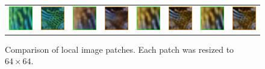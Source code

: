 \documentclass[letterpaper, 10pt, conference]{ieeeconf}
\begin{document}
\begin{figure}
\begin{tabular}{p{1.8cm} p{1.85cm} p{1.8cm} p{1.8cm} p{1.8cm} p{1.8cm} p{1.8cm} p{1.9cm} }
   \includegraphics[width=0.8in]{flickr_crop3} &
   \includegraphics[width=0.8in]{flickr_crop4} &
   \includegraphics[width=0.8in]{cgan_crop3} &
   \includegraphics[width=0.8in]{cgan_crop4} &
   \includegraphics[width=0.8in]{ugan_crop3} &
   \includegraphics[width=0.8in]{ugan_crop4} &
   \includegraphics[width=0.8in]{ugan_crop3} &
   \includegraphics[width=0.8in]{ugan_crop4} \\


\end{tabular}
\caption{Comparison of local image patches. Each patch was resized to $64 \times 64$.}
\label{fig:zoom}
\end{figure}
\end{document}
